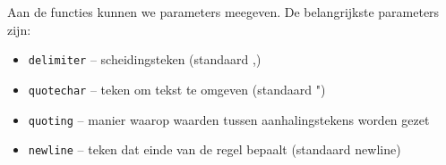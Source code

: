 Aan de functies kunnen we parameters meegeven. De belangrijkste parameters zijn:
\begin{itemize}
  \item \texttt{delimiter} -- scheidingsteken (standaard ,)
  \item \texttt{quotechar} -- teken om tekst te omgeven (standaard ")
  \item \texttt{quoting} -- manier waarop waarden tussen aanhalingstekens worden gezet
  \item \texttt{newline} -- teken dat einde van de regel bepaalt (standaard newline)
\end{itemize}

